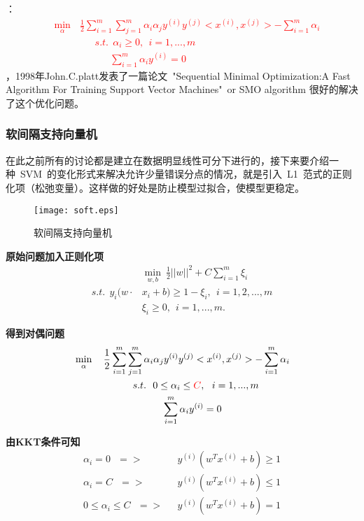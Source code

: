：
\textcolor{red}{\begin{align}
            &\min \limits_\alpha ~~~\frac{1}{2}\sum_{i=1}^{m}\sum_{j=1}^{m}\alpha_i\alpha_jy^{(i)}y^{(j)}<x^{(i)},x^{(j)}>-\sum_{i=1}^{m}\alpha_i \nonumber\nonumber\\
         &~~~~~~~~~~~~~~~~~~~~s.t.~~\alpha_i\geq 0,~~i=1,...,m \nonumber \\
               &~~~~~~~~~~~~~~~~~~~~~~~~~~~\sum_{i=1}^{m}\alpha_iy^{(i)}=0 \nonumber
\end{align}}
，1998年John.C.platt发表了一篇论文~"Sequential Minimal Optimization:A Fast Algorithm For Training Support Vector Machines"~or SMO algorithm 很好的解决了这个优化问题。


\subsubsection{软间隔支持向量机}
在此之前所有的讨论都是建立在数据明显线性可分下进行的，接下来要介绍一种~SVM~的变化形式来解决允许少量错误分点的情况，就是引入~L1~范式的正则化项（松弛变量）。这样做的好处是防止模型过拟合，使模型更稳定。
\begin{figure}[!htb]
  \centering
  \texttt{[image: soft.eps]}
  \caption{软间隔支持向量机}
\end{figure}

\textbf{原始问题加入正则化项} ~~
\begin{align}
            &\min \limits_{w,b} ~\frac{1}{2}||w||^2 + C\sum_{i=1}^{m}\xi_i  \nonumber  \\
    s.t.~~  y_i(w\cdot& x_i+b) \geq 1-\xi_i,~~i=1,2,...,m\nonumber\\
            ~~~&\xi_i\geq 0,~~i=1,...,m. \nonumber
\end{align}

\textbf{得到对偶问题} ~~
\begin{align}
            &\min \limits_\alpha ~~~\frac{1}{2}\sum_{i=1}^{m}\sum_{j=1}^{m}\alpha_i\alpha_jy^{(i)}y^{(j)}<x^{(i)},x^{(j)}>-\sum_{i=1}^{m}\alpha_i \nonumber\nonumber\\
         &~~~~~~~~~~~~~~~~~~s.t.~~0 \leq\alpha_i\leq \textcolor{red}{C},~~i=1,...,m \nonumber \\
               &~~~~~~~~~~~~~~~~~~~~~~~~~~~\sum_{i=1}^{m}\alpha_iy^{(i)}=0 \nonumber
\end{align}

\textbf{由KKT条件可知}
\begin{align}
    \alpha_i=0 ~~~ =>  &~~~y^{(i)}(w^Tx^{(i)}+b)\geq1   \nonumber\\
    \alpha_i=C ~~~ => &~~~y^{(i)}(w^Tx^{(i)}+b)\leq1   \nonumber\\
    0\leq\alpha_i\leq C ~~~ => &~~~y^{(i)}(w^Tx^{(i)}+b)=1   \nonumber
\end{align}

